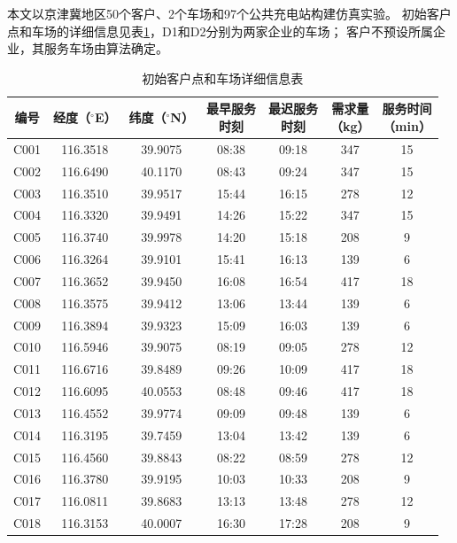 \documentclass{setp-new}
\begin{document}
本文以京津冀地区50个客户、2个车场和97个公共充电站构建仿真实验。
初始客户点和车场的详细信息见表\ref{tab:initial-nodes}，D1和D2分别为两家企业的车场；
客户不预设所属企业，其服务车场由算法确定。

\begin{table}[H]
\centering
\caption{初始客户点和车场详细信息表}
\label{tab:initial-nodes}
\small
\renewcommand{\arraystretch}{0.88}
\setlength{\tabcolsep}{1.2pt}
\begin{tabular*}{\textwidth}{@{\extracolsep{\fill}}ccccccc@{}}
\toprule
编号 & 经度（$^{\circ}$E） & 纬度（$^{\circ}$N） & \makecell{最早服务\\时刻} & \makecell{最迟服务\\时刻} & \makecell{需求量\\（kg）} & \makecell{服务时间\\（min）}\\
\midrule
C001 & 116.3518 & 39.9075 & 08:38 & 09:18 & 347 & 15\\
C002 & 116.6490 & 40.1170 & 08:43 & 09:24 & 347 & 15\\
C003 & 116.3510 & 39.9517 & 15:44 & 16:15 & 278 & 12\\
C004 & 116.3320 & 39.9491 & 14:26 & 15:22 & 347 & 15\\
C005 & 116.3740 & 39.9978 & 14:20 & 15:18 & 208 & 9\\
C006 & 116.3264 & 39.9101 & 15:41 & 16:13 & 139 & 6\\
C007 & 116.3652 & 39.9450 & 16:08 & 16:54 & 417 & 18\\
C008 & 116.3575 & 39.9412 & 13:06 & 13:44 & 139 & 6\\
C009 & 116.3894 & 39.9323 & 15:09 & 16:03 & 139 & 6\\
C010 & 116.5946 & 39.9075 & 08:19 & 09:05 & 278 & 12\\
C011 & 116.6716 & 39.8489 & 09:26 & 10:09 & 417 & 18\\
C012 & 116.6095 & 40.0553 & 08:48 & 09:46 & 417 & 18\\
C013 & 116.4552 & 39.9774 & 09:09 & 09:48 & 139 & 6\\
C014 & 116.3195 & 39.7459 & 13:04 & 13:42 & 139 & 6\\
C015 & 116.4560 & 39.8843 & 08:22 & 08:59 & 278 & 12\\
C016 & 116.3780 & 39.9195 & 10:03 & 10:33 & 208 & 9\\
C017 & 116.0811 & 39.8683 & 13:13 & 13:48 & 278 & 12\\
C018 & 116.3153 & 40.0007 & 16:30 & 17:28 & 208 & 9\\

\end{tabular*}
\end{table}
\end{document}
